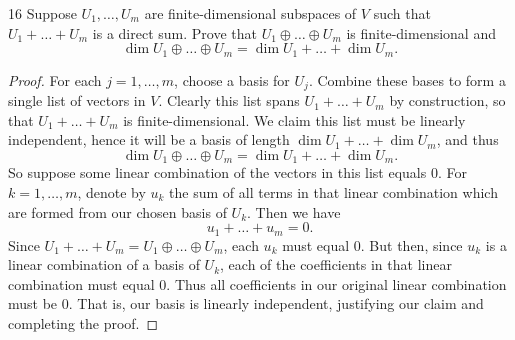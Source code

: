 \documentclass{extarticle}
\newenvironment{problem}[1]{\begin{prob*}{#1}{}}{\end{prob*}}
\begin{document}
\begin{problem}{16}
Suppose $U_1,\dots, U_m$ are finite-dimensional subspaces of $V$ such that $U_1 + \dots + U_m$ is a direct sum.  Prove that $U_1\oplus\dots\oplus U_m$ is finite-dimensional and 
\begin{equation*}
\dim U_1\oplus \dots \oplus U_m = \dim U_1 + \dots + \dim U_m.
\end{equation*}
\end{problem}
\begin{proof}
For each $j = 1,\dots,m$, choose a basis for $U_j$.  Combine these bases to form a single list of vectors in $V$.  Clearly this list spans $U_1 + \dots + U_m$ by construction, so that $U_1 + \dots + U_m$ is finite-dimensional.  We claim this list must be linearly independent, hence it will be a basis of length $\dim U_1 + \dots + \dim U_m$, and thus
\begin{equation*}
\dim U_1\oplus \dots \oplus U_m = \dim U_1 + \dots + \dim U_m.
\end{equation*}
So suppose some linear combination of the vectors in this list equals $0$.  For $k=1,\dots,m$, denote by $u_k$ the sum of all terms in that linear combination which are formed from our chosen basis of $U_k$.  Then we have
\begin{equation*}
u_1 + \dots + u_m = 0.
\end{equation*}
Since $U_1 + \dots + U_m = U_1\oplus\dots\oplus U_m$, each $u_k$ must equal $0$.  But then, since $u_k$ is a linear combination of a basis of $U_k$, each of the coefficients in that linear combination must equal $0$.  Thus all coefficients in our original linear combination must be $0$.  That is, our basis is linearly independent, justifying our claim and completing the proof.
\end{proof}
\end{document}
